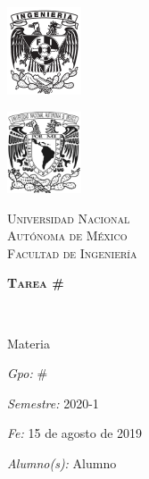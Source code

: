 \documentclass[a4paper,12pt]{article}
\newcommand{\coverPage}{
    \thispagestyle{empty}

    \begin{center}
      \begin{minipage}{0.48\textwidth} \begin{flushleft}
        \includegraphics[width=2.2cm]{fi-negro}
      \end{flushleft}\end{minipage}
      \begin{minipage}{0.48\textwidth} \begin{flushright}
        \includegraphics[width=2.2cm]{unam-negro}
      \end{flushright}\end{minipage}
      \vspace*{-2.5cm}

      \textsc{\LARGE \University}\\[0.5cm]

      \textsc{\large \faculty}\\[0.5cm]
      \begin{minipage}{0.9\textwidth}
      \begin{center}
      \textsc{\Large \bfseries \mytitle}
      \end{center}
      \end{minipage}\\[0.5cm]

      \begin{minipage}{0.46\textwidth}
        \begin{flushleft} \large
          \subject
          \vspace*{0.2cm}
        \end{flushleft}
      \end{minipage}
      \begin{minipage}{0.52\textwidth}
        \vspace{-0.6cm}
        \begin{flushright} \large
            \emph{ Gpo: } \group
        \end{flushright}
      \end{minipage}


      \begin{minipage}{0.46\textwidth}
        \begin{flushleft} \large
          \emph{Semestre: }
          \vspace{0.6cm}
          \semester
        \end{flushleft}
      \end{minipage}
      \begin{minipage}{0.52\textwidth}
        \vspace{-0.8cm}
        \begin{flushright} \large
          \emph{Fe: } \deliverDate
        \end{flushright}
      \end{minipage}

      \vspace{-0.8cm}

      \begin{flushleft} \large
        \emph{Alumno(s): }
        \students
      \end{flushleft}


    \end{center}

}
\begin{document}

\graphicspath{ {latex/assets/} }


\newcommand{\university}{UNAM}
\newcommand{\University}{Universidad Nacional\\ 
  \vspace{5px} Autónoma de México
}
\newcommand{\faculty}{Facultad de Ingeniería}

\newcommand{\subject}{Materia}
\newcommand{\mytitle}{ Tarea \# }
\newcommand{\mysubTitle}{Titulo}
\newcommand{\students}{ Alumno }
\newcommand{\teacher}{Nombre de profesor}
\newcommand{\group}{\#}
\newcommand{\semester}{2020-1}
\newcommand{\deliverDate}{15 de agosto de 2019}

\coverPage


\end{document}

